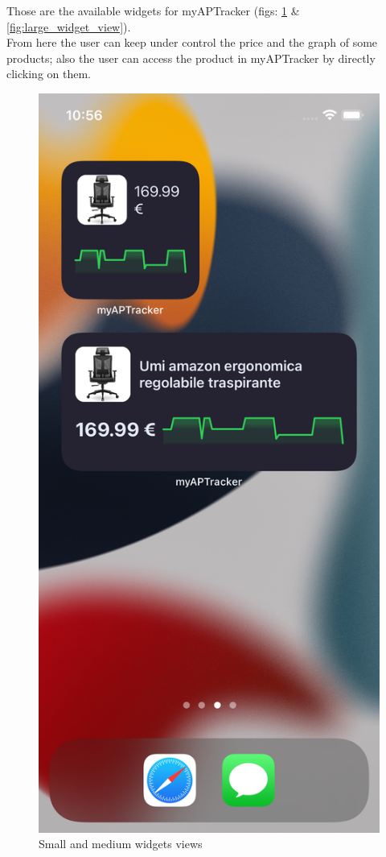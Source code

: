 Those are the available widgets for myAPTracker (figs: \ref{fig:small_medium_widget_view} \& \ref{fig:large_widget_view}).\\
From here the user can keep under control the price and the graph of some products; also the user can access the product in myAPTracker by directly clicking on them.
\begin{figure}[h!]
        \centering
        \includegraphics[scale=0.15]{images/interfaces/small_medium_widget_view.png}
        \caption{Small and medium widgets views}
        \label{fig:small_medium_widget_view}
\end{figure}
\FloatBarrier

